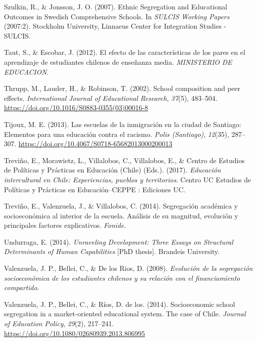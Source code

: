 \documentclass[
]{article}
\begin{document}
\leavevmode\hypertarget{ref-szulkin_ethnic_2007}{}%
Szulkin, R., \& Jonsson, J. O. (2007). Ethnic Segregation and
Educational Outcomes in Swedish Comprehensive Schools. In \emph{SULCIS
Working Papers} (2007:2). Stockholm University, Linnaeus Center for
Integration Studies - SULCIS.

\leavevmode\hypertarget{ref-taut_efecto_2012}{}%
Taut, S., \& Escobar, J. (2012). El efecto de las características de los
pares en el aprendizaje de estudiantes chilenos de enseñanza media.
\emph{MINISTERIO DE EDUCACION}.

\leavevmode\hypertarget{ref-thrupp_school_2002b}{}%
Thrupp, M., Lauder, H., \& Robinson, T. (2002). School composition and
peer effects. \emph{International Journal of Educational Research},
\emph{37}(5), 483--504.
\url{https://doi.org/10.1016/S0883-0355(03)00016-8}

\leavevmode\hypertarget{ref-tijoux_escuelas_2013}{}%
Tijoux, M. E. (2013). Las escuelas de la inmigración en la ciudad de
Santiago: Elementos para una educación contra el racismo. \emph{Polis
(Santiago)}, \emph{12}(35), 287--307.
\url{https://doi.org/10.4067/S0718-65682013000200013}

\leavevmode\hypertarget{ref-trevino_educacion_2017}{}%
Treviño, E., Morawietz, L., Villalobos, C., Villalobos, E., \& Centro de
Estudios de Políticas y Prácticas en Educación (Chile) (Eds.). (2017).
\emph{Educación intercultural en Chile: Experiencias, pueblos y
territorios}. Centro UC Estudios de Políticas y Prácticas en
Educación--CEPPE : Ediciones UC.

\leavevmode\hypertarget{ref-trevino_segregacion_2014}{}%
Treviño, E., Valenzuela, J., \& Villalobos, C. (2014). Segregación
académica y socioeconómica al interior de la escuela. Análisis de su
magnitud, evolución y principales factores explicativos. \emph{Fonide}.

\leavevmode\hypertarget{ref-undurraga_unraveling_2014}{}%
Undurraga, E. (2014). \emph{Unraveling Development: Three Essays on
Structural Determinants of Human Capabilities} {[}PhD thesis{]}.
Brandeis University.

\leavevmode\hypertarget{ref-valenzuela_evolucion_2008}{}%
Valenzuela, J. P., Bellei, C., \& De los Rios, D. (2008).
\emph{Evolución de la segregación socioeconómica de los estudiantes
chilenos y su relación con el financiamiento compartido}.

\leavevmode\hypertarget{ref-valenzuela_socioeconomic_2014}{}%
Valenzuela, J. P., Bellei, C., \& Ríos, D. de los. (2014). Socioeconomic
school segregation in a market-oriented educational system. The case of
Chile. \emph{Journal of Education Policy}, \emph{29}(2), 217--241.
\url{https://doi.org/10.1080/02680939.2013.806995}
\end{document}
